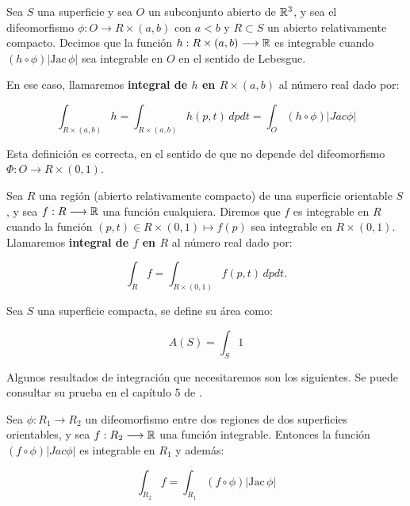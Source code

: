 \begin{definition}
Sea $S$ una superficie y sea $O$ un subconjunto abierto de $\mathbb{R}^3$, y sea el difeomorfismo $\phi: O \longrightarrow R \times (a,b)$ con $a < b$ y $R \subset S$ un abierto relativamente compacto. Decimos que la función $h: R \times (a,b) \longrightarrow \mathbb{R}$ es integrable cuando $(h \circ \phi)|\text{Jac} \, \phi|$ sea integrable en $O$ en el sentido de Lebesgue.

En ese caso, llamaremos \textbf{integral de $h$ en $R \times (a,b)$} al número real dado por:

\begin{equation*}
    \int_{R \times (a,b)} h = \int_{R \times (a,b)} h(p, t) \, dp dt = \int_{O} (h \circ \phi)|Jac \phi|
\end{equation*}
\end{definition}

Esta definición es correcta, en el sentido de que no depende del difeomorfismo $\Phi: O \longrightarrow R \times (0,1)$.

\begin{definition}[Integral en $S$]
Sea $R$ una región (abierto relativamente compacto) de una superficie orientable $S$, y sea $f:R \longrightarrow \mathbb{R}$ una función cualquiera. Diremos que $f$ es integrable en $R$ cuando la función $(p,t) \in R \times (0,1) \mapsto f(p)$ sea integrable en $R \times (0,1)$. Llamaremos \textbf{integral de $f$ en $R$} al número real dado por:

\begin{equation*}
    \int_{R} f = \int_{R \times (0,1)} f(p,t) \, dp dt.
\end{equation*}
\end{definition}

\begin{definition}
Sea $S$ una superficie compacta, se define su área como:

\begin{equation*}
    A(S) = \int_S 1
\end{equation*}
\end{definition}

Algunos resultados de integración que necesitaremos son los siguientes. Se puede consultar su prueba en el capítulo 5 de \cite{montielrosbook}.

\begin{theorem}
Sea $\phi:R_1 \longrightarrow R_2$ un difeomorfismo entre dos regiones de dos superficies orientables, y sea $f: R_2 \longrightarrow \mathbb{R}$ una función integrable. Entonces la función $(f \circ \phi)|Jac \phi|$ es integrable en $R_1$ y además:

\begin{equation*}
    \int_{R_2} f = \int_{R_1} (f \circ \phi)|\text{Jac} \, \phi|
\end{equation*}
\end{theorem}

